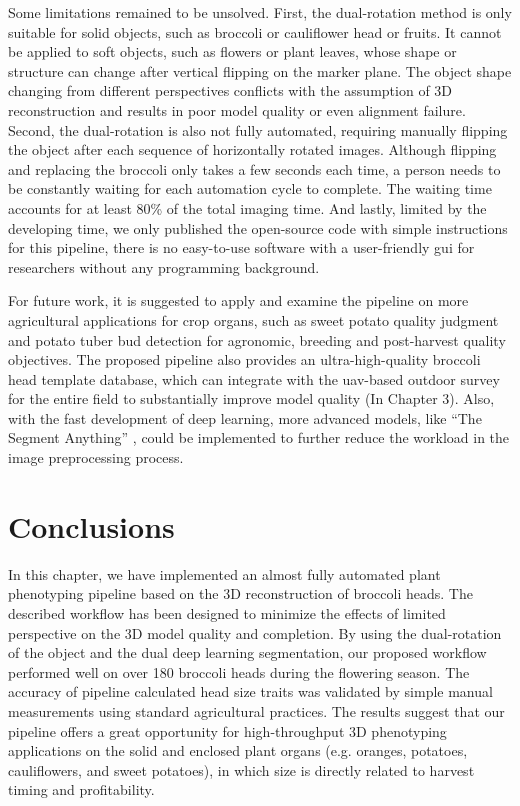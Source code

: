 Some limitations remained to be unsolved. First, the dual-rotation method is only suitable for solid objects, such as broccoli or cauliflower head or fruits. It cannot be applied to soft objects, such as flowers or plant leaves, whose shape or structure can change after vertical flipping on the marker plane. The object shape changing from different perspectives conflicts with the assumption of 3D reconstruction and results in poor model quality or even alignment failure. Second, the dual-rotation is also not fully automated, requiring manually flipping the object after each sequence of horizontally rotated images. Although flipping and replacing the broccoli only takes a few seconds each time, a person needs to be constantly waiting for each automation cycle to complete. The waiting time accounts for at least 80\% of the total imaging time. And lastly, limited by the developing time, we only published the open-source code with simple instructions for this pipeline, there is no easy-to-use software with a user-friendly \gls{gui} for researchers without any programming background.

For future work, it is suggested to apply and examine the pipeline on more agricultural applications for crop organs, such as sweet potato quality judgment and potato tuber bud detection for agronomic, breeding and post-harvest quality objectives. The proposed pipeline also provides an ultra-high-quality broccoli head template database, which can integrate with the \gls{uav}-based outdoor survey for the entire field to substantially improve model quality (In Chapter 3). Also, with the fast development of deep learning, more advanced models, like ``The Segment Anything'' \citep{kirillov_segment_2023}, could be implemented to further reduce the workload in the image preprocessing process.

\section{Conclusions}

In this chapter, we have implemented an almost fully automated plant phenotyping pipeline based on the 3D reconstruction of broccoli heads. The described workflow has been designed to minimize the effects of limited perspective on the 3D model quality and completion. By using the dual-rotation of the object and the dual deep learning segmentation, our proposed workflow performed well on over 180 broccoli heads during the flowering season. The accuracy of pipeline calculated head size traits was validated by simple manual measurements using standard agricultural practices. The results suggest that our pipeline offers a great opportunity for high-throughput 3D phenotyping applications on the solid and enclosed plant organs (e.g. oranges, potatoes, cauliflowers, and sweet potatoes), in which size is directly related to harvest timing and profitability.